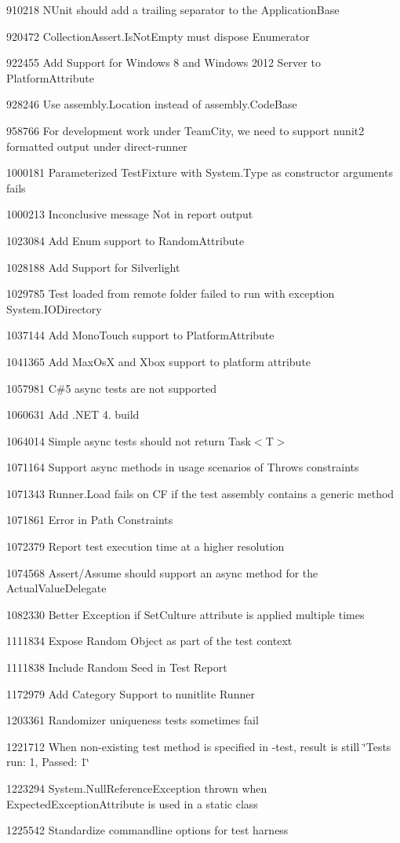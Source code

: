 \begin{DoxyItemize}
\item 910218 N\+Unit should add a trailing separator to the Application\+Base
\item 920472 Collection\+Assert.\+Is\+Not\+Empty must dispose Enumerator
\item 922455 Add Support for Windows 8 and Windows 2012 Server to Platform\+Attribute
\item 928246 Use assembly.\+Location instead of assembly.\+Code\+Base
\item 958766 For development work under Team\+City, we need to support nunit2 formatted output under direct-\/runner
\item 1000181 Parameterized Test\+Fixture with System.\+Type as constructor arguments fails
\item 1000213 Inconclusive message Not in report output
\item 1023084 Add Enum support to Random\+Attribute
\item 1028188 Add Support for Silverlight
\item 1029785 Test loaded from remote folder failed to run with exception System.\+I\+O\+Directory
\item 1037144 Add Mono\+Touch support to Platform\+Attribute
\item 1041365 Add Max\+OsX and Xbox support to platform attribute
\item 1057981 C\#5 async tests are not supported
\item 1060631 Add .N\+ET 4. build
\item 1064014 Simple async tests should not return {\ttfamily Task$<$T$>$}
\item 1071164 Support async methods in usage scenarios of Throws constraints
\item 1071343 Runner.\+Load fails on CF if the test assembly contains a generic method
\item 1071861 Error in Path Constraints
\item 1072379 Report test execution time at a higher resolution
\item 1074568 Assert/\+Assume should support an async method for the Actual\+Value\+Delegate
\item 1082330 Better Exception if Set\+Culture attribute is applied multiple times
\item 1111834 Expose Random Object as part of the test context
\item 1111838 Include Random Seed in Test Report
\item 1172979 Add Category Support to nunitlite Runner
\item 1203361 Randomizer uniqueness tests sometimes fail
\item 1221712 When non-\/existing test method is specified in -\/test, result is still \char`\"{}\+Tests run\+: 1, Passed\+: 1\char`\"{}
\item 1223294 System.\+Null\+Reference\+Exception thrown when Expected\+Exception\+Attribute is used in a static class
\item 1225542 Standardize commandline options for test harness
\end{DoxyItemize}

